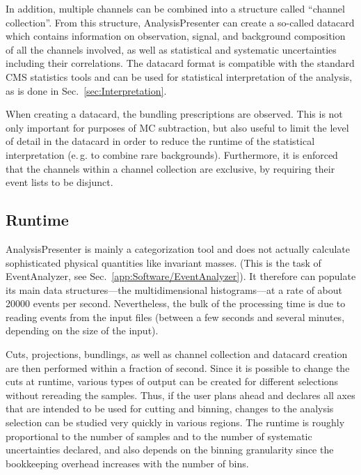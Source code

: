 In addition, multiple channels can be combined into a structure called ``channel collection''. From this structure, AnalysisPresenter can create a so-called datacard which contains information on observation, signal, and background composition of all the channels involved, as well as statistical and systematic uncertainties including their correlations. The datacard format is compatible with the standard CMS statistics tools and can be used for statistical interpretation of the analysis, as is done in Sec.~\ref{sec:Interpretation}.

When creating a datacard, the bundling prescriptions are observed. This is not only important for purposes of MC subtraction, but also useful to limit the level of detail in the datacard in order to reduce the runtime of the statistical interpretation (e.\,g. to combine rare backgrounds). Furthermore, it is enforced that the channels within a channel collection are exclusive, by requiring their event lists to be disjunct.

\subsection{Runtime}
AnalysisPresenter is mainly a categorization tool and does not actually calculate sophisticated physical quantities like invariant masses. (This is the task of EventAnalyzer, see Sec.~\ref{app:Software/EventAnalyzer}). It therefore can populate its main data structures\hairspace{}---\hairspace{}the multidimensional histograms\hairspace{}---\hairspace{}at a rate of about 20000 events per second. Nevertheless, the bulk of the processing time is due to reading events from the input files (between a few seconds and several minutes, depending on the size of the input).

Cuts, projections, bundlings, as well as channel collection and datacard creation are then performed within a fraction of second. Since it is possible to change the cuts at runtime, various types of output can be created for different selections without rereading the samples. Thus, if the user plans ahead and declares all axes that are intended to be used for cutting and binning, changes to the analysis selection can be studied very quickly in various regions. The runtime is roughly proportional to the number of samples and to the number of systematic uncertainties declared, and also depends on the binning granularity since the bookkeeping overhead increases with the number of bins.
